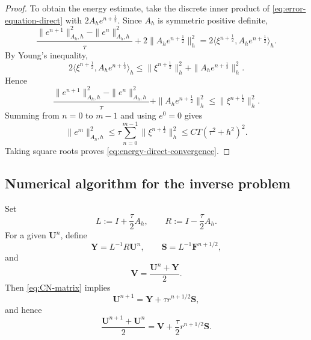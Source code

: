 \documentclass[reqno]{amsart}
\newcommand{\Ah}{A_h}
\begin{document}
\begin{proof}
To obtain the energy estimate, take the discrete inner product of
\eqref{eq:error-equation-direct} with
\(2A_h e^{n+\frac12}\). Since \(A_h\) is symmetric positive definite,
\[
\frac{
\|e^{n+1}\|_{A_h,h}^2
-
\|e^n\|_{A_h,h}^2
}{\tau}
+
2\|A_h e^{n+\frac12}\|_h^2
=
2\langle
\xi^{n+\frac12},
A_h e^{n+\frac12}
\rangle_h.
\]
By Young's inequality,
\[
2\langle
\xi^{n+\frac12},
A_h e^{n+\frac12}
\rangle_h
\le
\|\xi^{n+\frac12}\|_h^2
+
\|A_h e^{n+\frac12}\|_h^2.
\]
Hence
\[
\frac{
\|e^{n+1}\|_{A_h,h}^2
-
\|e^n\|_{A_h,h}^2
}{\tau}
+
\|A_h e^{n+\frac12}\|_h^2
\le
\|\xi^{n+\frac12}\|_h^2.
\]
Summing from \(n=0\) to \(m-1\) and using \(e^0=0\) gives
\[
\|e^m\|_{A_h,h}^2
\le
\tau
\sum_{n=0}^{m-1}
\|\xi^{n+\frac12}\|_h^2
\le
CT(\tau^2+h^2)^2.
\]
Taking square roots proves
\eqref{eq:energy-direct-convergence}.
\end{proof}



\subsection{Numerical algorithm for the inverse problem}
Set
\begin{equation}\label{eq:LR}
 L:=I+\frac\tau2\Ah,\qquad R:=I-\frac\tau2\Ah.
\end{equation}
For a given $\mathbf U^n$, define
\begin{equation}\label{eq:Y-S}
 \mathbf Y=L^{-1}R\mathbf U^n,
 \qquad
 \mathbf S=L^{-1}\mathbf F^{n+1/2},
\end{equation}
and
\begin{equation}\label{eq:V}
 \mathbf V=\frac{\mathbf U^n+\mathbf Y}{2}.
\end{equation}
Then \eqref{eq:CN-matrix} implies
\begin{equation}\label{eq:U-next}
 \mathbf U^{n+1}=\mathbf Y+\tau r^{n+1/2}\mathbf S,
\end{equation}
and hence
\[
 \frac{\mathbf U^{n+1}+\mathbf U^n}{2}
 =\mathbf V+\frac\tau2r^{n+1/2}\mathbf S.
\]
\end{document}

